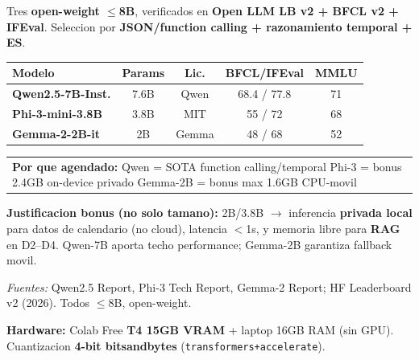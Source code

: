 \documentclass[a4paper,10pt]{article}
\begin{document}
\begin{multicols}{2}
\begin{tcolorbox}[colback=white,colframe=agendaAccent,arc=2pt,boxrule=0.7pt,title={\bfseries\small 3. Model Candidates \quad {\normalfont\scriptsize(10 pts + Bonus 3)}},fonttitle=\color{white},colbacktitle=agendaAccent,left=3pt,right=3pt,top=2pt,bottom=3pt]
\scriptsize
Tres \textbf{open-weight $\leq$8B}, verificados en \textbf{Open LLM LB v2 + BFCL v2 + IFEval}. Seleccion por \textbf{JSON/function calling + razonamiento temporal + ES}.

\renewcommand{\arraystretch}{1.15}
\begin{center}
\begin{tabular}{lcccc}
\toprule
\textbf{Modelo} & \textbf{Params} & \textbf{Lic.} & \textbf{BFCL/IFEval} & \textbf{MMLU} \\
\midrule
\textbf{Qwen2.5-7B-Inst.} & 7.6B & Qwen & 68.4 / 77.8 & 71 \\
\textbf{Phi-3-mini-3.8B} & 3.8B & MIT & 55 / 72 & 68 \\
\textbf{Gemma-2-2B-it} & 2B & Gemma & 48 / 68 & 52 \\
\bottomrule
\end{tabular}
\end{center}
\begin{center}
\begin{tabular}{p{7.2cm}}
\scriptsize \textbf{Por que agendado:} Qwen = SOTA function calling/temporal \textbar{} Phi-3 = bonus 2.4GB on-device privado \textbar{} Gemma-2B = bonus max 1.6GB CPU-movil \\
\end{tabular}
\end{center}

\textbf{Justificacion bonus (no solo tamano):} 2B/3.8B $\rightarrow$ inferencia \textbf{privada local} para datos de calendario (no cloud), latencia $<$1s, y memoria libre para \textbf{RAG} en D2--D4. Qwen-7B aporta techo performance; Gemma-2B garantiza fallback movil.

\textit{Fuentes:} Qwen2.5 Report, Phi-3 Tech Report, Gemma-2 Report; HF Leaderboard v2 (2026). Todos $\leq$8B, open-weight.
\end{tcolorbox}

\begin{tcolorbox}[colback=white,colframe=okGreen,arc=2pt,boxrule=0.7pt,title={\bfseries\small 4. Execution Feasibility \quad {\normalfont\scriptsize(10 pts)}},fonttitle=\color{white},colbacktitle=okGreen,left=3pt,right=3pt,top=2pt,bottom=3pt]
\scriptsize
\textbf{Hardware:} Colab Free \textbf{T4 15GB VRAM} + laptop 16GB RAM (sin GPU). Cuantizacion \textbf{4-bit bitsandbytes} (\texttt{transformers+accelerate}).


\end{tcolorbox}
\end{multicols}
\end{document}
